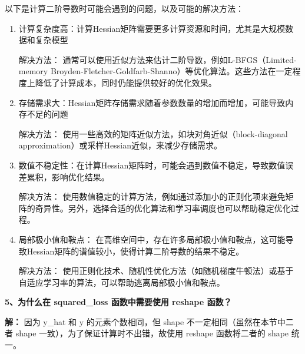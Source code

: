 \documentclass[UTF8]{ctexart}
\begin{document}
	以下是计算二阶导数时可能会遇到的问题，以及可能的解决方法：
	\begin{enumerate}
		\item 计算复杂度高：计算Hessian矩阵需要更多计算资源和时间，尤其是大规模数据和复杂模型
		
		解决方法： 通常可以使用近似方法来估计二阶导数，例如L-BFGS（Limited-memory Broyden-Fletcher-Goldfarb-Shanno）等优化算法。这些方法在一定程度上降低了计算成本，同时仍能提供较好的优化效果。
		\item 存储需求大：Hessian矩阵存储需求随着参数数量的增加而增加，可能导致内存不足的问题
		
		解决方法： 使用一些高效的矩阵近似方法，如块对角近似（block-diagonal approximation）或采样Hessian近似，来减少存储需求。
		\item 数值不稳定性：在计算Hessian矩阵时，可能会遇到数值不稳定，导致数值误差累积，影响优化结果。
		
		解决方法： 使用数值稳定的计算方法，例如通过添加小的正则化项来避免矩阵的奇异性。另外，选择合适的优化算法和学习率调度也可以帮助稳定优化过程。
		\item 局部极小值和鞍点： 在高维空间中，存在许多局部极小值和鞍点，这可能导致Hessian矩阵的谱值较小，使得计算二阶导数的结果不稳定。
		
		解决方法： 使用正则化技术、随机性优化方法（如随机梯度牛顿法）或基于自适应学习率的算法，可以帮助逃离局部极小值和鞍点。
	\end{enumerate}
	
	\textbf{5、为什么在 squared\_loss 函数中需要使用 reshape 函数？}
	
	\noindent \textbf{解：} 因为 y\_hat 和 y 的元素个数相同，但 shape 不一定相同（虽然在本节中二者 shape 一致），为了保证计算时不出错，故使用 reshape 函数将二者的 shape 统一。
	
\end{document}
